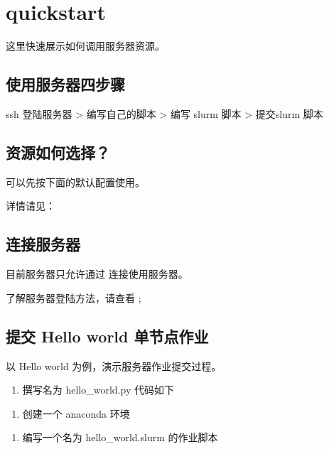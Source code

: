 \documentclass[a4paper,12pt,english]{sphinxmanual}
\begin{document}
\chapter{quickstart}
\label{\detokenize{quickstart/index:quickstart}}\label{\detokenize{quickstart/index::doc}}
\sphinxAtStartPar
这里快速展示如何调用服务器资源。


\section{使用服务器四步骤}
\label{\detokenize{quickstart/index:id1}}
\sphinxAtStartPar
ssh 登陆服务器 \sphinxhyphen{}> 编写自己的脚本 \sphinxhyphen{}> 编写 slurm 脚本 \sphinxhyphen{}> 提交slurm 脚本


\section{资源如何选择？}
\label{\detokenize{quickstart/index:id2}}
\sphinxAtStartPar
可以先按下面的默认配置使用。

\sphinxAtStartPar
详情请见：


\section{连接服务器}
\label{\detokenize{quickstart/index:id3}}
\sphinxAtStartPar
目前服务器只允许通过 连接使用服务器。

\sphinxAtStartPar
了解服务器登陆方法，请查看 ;


\section{提交 Hello world 单节点作业}
\label{\detokenize{quickstart/index:hello-world}}
\sphinxAtStartPar
以 Hello world 为例，演示服务器作业提交过程。
\begin{enumerate}
%
\item {} 
\sphinxAtStartPar
撰写名为 hello\_world.py 代码如下

\end{enumerate}

\begin{sphinxVerbatim}[commandchars=\\\{\}]
\end{sphinxVerbatim}
\begin{enumerate}
%
\setcounter{enumi}{1}
\item {} 
\sphinxAtStartPar
创建一个 anaconda 环境

\end{enumerate}
\begin{enumerate}
%
\setcounter{enumi}{2}
\item {} 
\sphinxAtStartPar
编写一个名为 hello\_world.slurm 的作业脚本

\end{enumerate}
\end{document}
